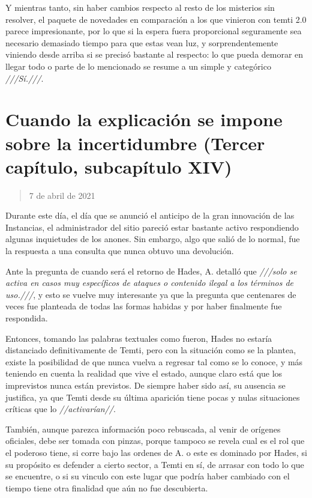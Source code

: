 \documentclass[
  spanish,
]{book}
\begin{document}
Y mientras tanto, sin haber cambios respecto al resto de los misterios sin resolver, el paquete de novedades en comparación a los que vinieron con temti 2.0 parece impresionante, por lo que si la espera fuera proporcional seguramente sea necesario demasiado tiempo para que estas vean luz, y sorprendentemente viniendo desde arriba si se precisó bastante al respecto: lo que pueda demorar en llegar todo o parte de lo mencionado se resume a un simple y categórico \emph{///Sí.///}.

\hypertarget{cuando-la-explicaciuxf3n-se-impone-sobre-la-incertidumbre-tercer-capuxedtulo-subcapuxedtulo-xiv}{%
\section{Cuando la explicación se impone sobre la incertidumbre (Tercer capítulo, subcapítulo XIV)}\label{cuando-la-explicaciuxf3n-se-impone-sobre-la-incertidumbre-tercer-capuxedtulo-subcapuxedtulo-xiv}}

\begin{quote}
7 de abril de 2021
\end{quote}

Durante este día, el día que se anunció el anticipo de la gran innovación de las Instancias, el administrador del sitio pareció estar bastante activo respondiendo algunas inquietudes de los anones. Sin embargo, algo que salió de lo normal, fue la respuesta a una consulta que nunca obtuvo una devolución.

Ante la pregunta de cuando será el retorno de Hades, A. detalló que \emph{///solo se activa en casos muy específicos de ataques o contenido ilegal a los términos de uso.///}, y esto se vuelve muy interesante ya que la pregunta que centenares de veces fue planteada de todas las formas habidas y por haber finalmente fue respondida.

Entonces, tomando las palabras textuales como fueron, Hades no estaría distanciado definitivamente de Temti, pero con la situación como se la plantea, existe la posibilidad de que nunca vuelva a regresar tal como se lo conoce, y más teniendo en cuenta la realidad que vive el estado, aunque claro está que los imprevistos nunca están previstos. De siempre haber sido así, su ausencia se justifica, ya que Temti desde su última aparición tiene pocas y nulas situaciones críticas que lo \emph{//activarían//}.

También, aunque parezca información poco rebuscada, al venir de orígenes oficiales, debe ser tomada con pinzas, porque tampoco se revela cual es el rol que el poderoso tiene, si corre bajo las ordenes de A. o este es dominado por Hades, si su propósito es defender a cierto sector, a Temti en sí, de arrasar con todo lo que se encuentre, o si su vinculo con este lugar que podría haber cambiado con el tiempo tiene otra finalidad que aún no fue descubierta.
\end{document}
